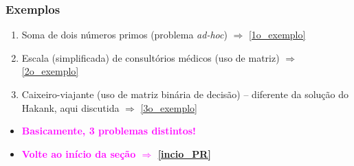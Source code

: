 \begin{frame}[fragile] 

\frametitle{Exemplos}

\label{3_exemplos}
\begin{block}{}
\begin{enumerate}
  \item Soma de dois números primos (problema \textit{ad-hoc})
  $\Rightarrow $ \ref{1o_exemplo}
  
  
  \pause
  \item Escala (simplificada) de consultórios médicos (uso de
  matriz)   $\Rightarrow $ \ref{2o_exemplo}
    
  \pause
  \item Caixeiro-viajante (uso de matriz binária de decisão) -- diferente
  da solução do Hakank, aqui discutida $\Rightarrow $ \ref{3o_exemplo}
      
\end{enumerate}
\end{block}

  \begin{center}
\begin{itemize}

    \item   \textbf{\textcolor{magenta}{Basicamente, 3 problemas distintos!}}
    
 \item   \textbf{\textcolor{magenta}{Volte ao início da seção $\Rightarrow$ \ref{incio_PR} }  }

  \end{itemize}  

  \end{center}

\end{frame}




